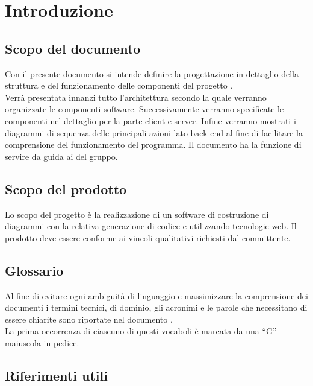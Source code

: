 \documentclass[../DefinizioneDiProdotto.tex]{subfiles}
\begin{document}
	\section{Introduzione}
		\subsection{Scopo del documento} 
			Con il presente documento si intende definire la progettazione in dettaglio della struttura e del funzionamento delle componenti del progetto \progetto.\\
			Verrà presentata innanzi tutto l'architettura secondo la quale verranno
			organizzate le componenti software. Successivamente verranno specificate le componenti nel dettaglio per la parte client e server.
			Infine verranno mostrati i diagrammi di sequenza delle principali azioni lato back-end al fine di facilitare la comprensione del funzionamento del programma. %
			Il documento ha la funzione di servire da guida ai \programmatori  del gruppo.
		\subsection{Scopo del prodotto}
			Lo scopo del progetto è la realizzazione di un software di
			costruzione di diagrammi  con la relativa generazione
			di codice  e  utilizzando tecnologie
			web. Il prodotto deve essere conforme ai vincoli qualitativi
			richiesti dal committente.
		\subsection{Glossario}
			Al fine di evitare ogni ambiguità di linguaggio e massimizzare la
			comprensione dei documenti i termini tecnici, di dominio, gli
			acronimi e le parole che necessitano di essere chiarite sono
			riportate nel documento \glossariov.\\
			La prima occorrenza di ciascuno di questi vocaboli è
			marcata da una ``G'' maiuscola in pedice.
		\subsection{Riferimenti utili}
\end{document}
